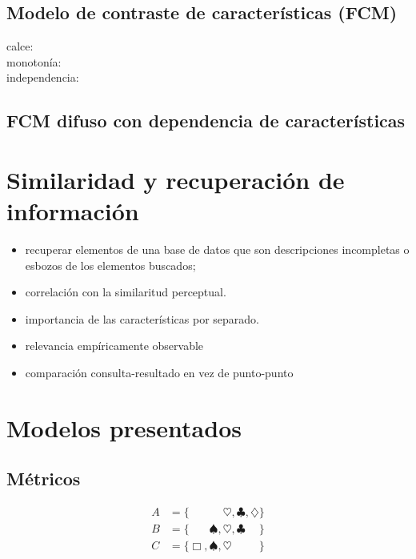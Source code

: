 \documentclass[spanish]{article}
\begin{document}
\subsection{Modelo de contraste de características (FCM)}
\begin{description}
    \item [calce:]
    \item [monotonía:]
    \item [independencia:]
\end{description}

\subsection{FCM difuso con dependencia de características}


\section{Similaridad y recuperación de información}


\begin{itemize}
    \item recuperar elementos de una base de datos que son descripciones
        incompletas o esbozos de los elementos buscados;
    \item correlación con la similaritud perceptual.
    \item importancia de las características por separado.
    \item relevancia empíricamente observable
    \item comparación consulta-resultado en vez de punto-punto
\end{itemize}



\section{Modelos presentados}
\subsection{Métricos}





\newcommand{\SMA}{\Box}
\newcommand{\SMB}{\spadesuit}
\newcommand{\SMC}{\heartsuit}
\newcommand{\SMD}{\clubsuit}
\newcommand{\SME}{\diamondsuit}

\begin{align*}
    A &= \{\phantom{\SMA,  \SMB,} \SMC,          \SMD,          \SME\}  \\
    B &= \{\phantom{\SMA,} \SMB,  \SMC,          \SMD\phantom{, \SME}\} \\
    C &=          \{\SMA,  \SMB,  \SMC\phantom{, \SMD,          \SME}\} \\
\end{align*}
\end{document}
